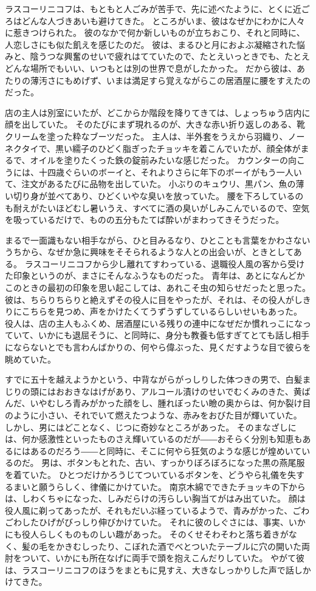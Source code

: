ラスコーリニコフは、もともと人ごみが苦手で、先に述べたように、とくに近ごろはどんな人づきあいも避けてきた。
ところがいま、彼はなぜかにわかに人々に惹きつけられた。
彼のなかで何か新しいものが立ちおこり、それと同時に、人恋しさにも似た飢えを感じたのだ。
彼は、まるひと月におよぶ凝縮された悩みと、陰うつな興奮のせいで疲れはてていたので、たとえいっときでも、たとえどんな場所でもいい、いつもとは別の世界で息がしたかった。
だから彼は、あたりの薄汚さにもめげず、いまは満足すら覚えながらこの居酒屋に腰をすえたのだった。

店の主人は別室にいたが、どこからか階段を降りてきては、しょっちゅう店内に顔を出していた。
そのたびにまず現れるのが、大きな赤い折り返しのある、靴クリームを塗った粋なブーツだった。
主人は、半外套をうえから羽織り、ノーネクタイで、黒い繻子のひどく脂ぎったチョッキを着こんでいたが、顔全体がまるで、オイルを塗りたくった鉄の錠前みたいな感じだった。
カウンターの向こうには、十四歳ぐらいのボーイと、それよりさらに年下のボーイがもう一人いて、注文があるたびに品物を出していた。
小ぶりのキュウリ、黒パン、魚の薄い切り身が並べてあり、ひどくいやな臭いを放っていた。
腰を下ろしているのも耐えがたいほどむし暑いうえ、すべてに酒の臭いがしみこんでいるので、空気を吸っているだけで、ものの五分もたてば酔いがまわってきそうだった。

まるで一面識もない相手ながら、ひと目みるなり、ひとことも言葉をかわさないうちから、なぜか急に興味をそそられるような人との出会いが、ときとしてある。
ラスコーリニコフから少し離れてすわっている、退職役人風の客から受けた印象というのが、まさにそんなふうなものだった。
青年は、あとになんどかこのときの最初の印象を思い起こしては、あれこそ虫の知らせだったと思った。
彼は、ちらりちらりと絶えずその役人に目をやったが、それは、その役人がしきりにこちらを見つめ、声をかけたくてうずうずしているらしいせいもあった。
役人は、店の主人もふくめ、居酒屋にいる残りの連中になぜだか慣れっこになっていて、いかにも退屈そうに、と同時に、身分も教養も低すぎてとても話し相手にならないとでも言わんばかりの、何やら偉ぶった、見くだすような目で彼らを眺めていた。

すでに五十を越えようかという、中背ながらがっしりした体つきの男で、白髪まじりの頭にはおおきなはげがあり、アルコール漬けのせいでむくみのきた、黄ばんだ、いやむしろ青みがかった顔をし、腫れぼったい瞼の奥からは、何か裂け目のように小さい、それでいて燃えたつような、赤みをおびた目が輝いていた。
しかし、男にはどことなく、じつに奇妙なところがあった。
そのまなざしには、何か感激性といったものさえ輝いているのだが――おそらく分別も知恵もあるにはあるのだろう――と同時に、そこに何やら狂気のような感じが煌めいているのだ。
男は、ボタンもとれた、古い、すっかりぼろぼろになった黒の燕尾服を着ていた。
ひとつだけかろうじてついているボタンを、どうやら礼儀を失するまいと願うらしく、律儀にかけていた。
南京木綿でできたチョッキの下からは、しわくちゃになった、しみだらけの汚らしい胸当てがはみ出ていた。
顔は役人風に剃ってあったが、それもだいぶ経っているようで、青みがかった、ごわごわしたひげがびっしり伸びかけていた。
それに彼のしぐさには、事実、いかにも役人らしくものものしい趣があった。
そのくせそわそわと落ち着きがなく、髪の毛をかきむしったり、こぼれた酒でべとついたテーブルに穴の開いた両肘をついて、いかにも所在なげに両手で頭を抱えこんだりしていた。
やがて彼は、ラスコーリニコフのほうをまともに見すえ、大きなしっかりした声で話しかけてきた。

